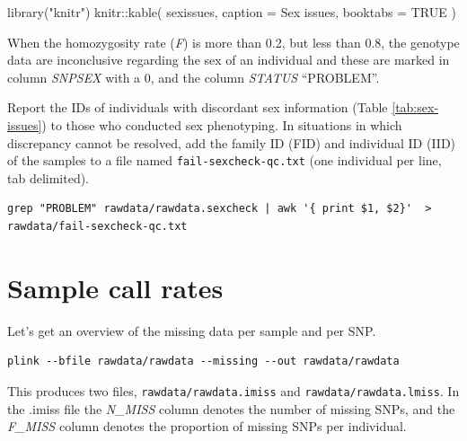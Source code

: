 \documentclass[
]{book}
\newenvironment{Shaded}{\begin{snugshade}}{\end{snugshade}}
\newcommand{\AttributeTok}[1]{\textcolor[rgb]{0.77,0.63,0.00}{#1}}
\newcommand{\ConstantTok}[1]{\textcolor[rgb]{0.00,0.00,0.00}{#1}}
\newcommand{\DecValTok}[1]{\textcolor[rgb]{0.00,0.00,0.81}{#1}}
\newcommand{\FunctionTok}[1]{\textcolor[rgb]{0.00,0.00,0.00}{#1}}
\newcommand{\NormalTok}[1]{#1}
\newcommand{\OtherTok}[1]{\textcolor[rgb]{0.56,0.35,0.01}{#1}}
\newcommand{\SpecialCharTok}[1]{\textcolor[rgb]{0.00,0.00,0.00}{#1}}
\newcommand{\StringTok}[1]{\textcolor[rgb]{0.31,0.60,0.02}{#1}}
\begin{document}
\begin{Shaded}
\begin{Highlighting}[]
\FunctionTok{library}\NormalTok{(}\StringTok{"knitr"}\NormalTok{)}
\NormalTok{knitr}\SpecialCharTok{::}\FunctionTok{kable}\NormalTok{(}
\NormalTok{  sexissues, }\AttributeTok{caption =} \StringTok{\textquotesingle{}Sex issues\textquotesingle{}}\NormalTok{,}
  \AttributeTok{booktabs =} \ConstantTok{TRUE}
\NormalTok{)}
\end{Highlighting}
\end{Shaded}

When the homozygosity rate (\emph{F}) is more than 0.2, but less than 0.8, the genotype data are inconclusive regarding the sex of an individual and these are marked in column \emph{SNPSEX} with a 0, and the column \emph{STATUS} ``PROBLEM''.

Report the IDs of individuals with discordant sex information (Table \ref{tab:sex-issues}) to those who conducted sex phenotyping. In situations in which discrepancy cannot be resolved, add the family ID (FID) and individual ID (IID) of the samples to a file named \texttt{fail-sexcheck-qc.txt} (one individual per line, tab delimited).

\begin{verbatim}
grep "PROBLEM" rawdata/rawdata.sexcheck | awk '{ print $1, $2}'  > rawdata/fail-sexcheck-qc.txt
\end{verbatim}

\hypertarget{sample-call-rates}{%
\section{Sample call rates}\label{sample-call-rates}}

Let's get an overview of the missing data per sample and per SNP.

\begin{verbatim}
plink --bfile rawdata/rawdata --missing --out rawdata/rawdata
\end{verbatim}

This produces two files, \texttt{rawdata/rawdata.imiss} and \texttt{rawdata/rawdata.lmiss}. In the .imiss file the \emph{N\_MISS} column denotes the number of missing SNPs, and the \emph{F\_MISS} column denotes the proportion of missing SNPs per individual.

\begin{Shaded}
\end{Shaded}
\end{document}
